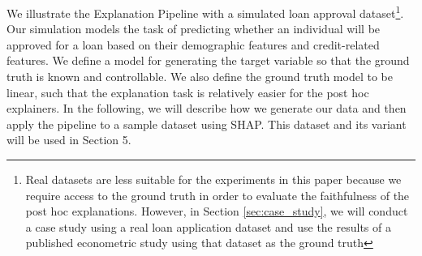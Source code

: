 \documentclass[mnsc,blindrev]{informs3}
\begin{document}
    We illustrate the Explanation Pipeline with a simulated loan approval dataset\footnote{Real datasets are less suitable for the experiments in this paper because we require access to the ground truth in order to evaluate the faithfulness of the post hoc explanations. However, in Section \ref{sec:case_study}, we will conduct a case study using a real loan application dataset and use the results of a published econometric study using that dataset as the ground truth}. Our simulation models the task of predicting whether an individual will be approved for a loan based on their demographic features and credit-related features. We define a model for generating the target variable so that the ground truth is known and controllable. We also define the ground truth model to be linear, such that the explanation task is relatively easier for the post hoc explainers. %
    In the following, we will describe how we generate our data and then apply the pipeline to a sample dataset using SHAP. This dataset and its variant will be used in Section 5. %
\end{document}
